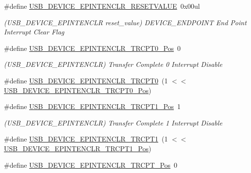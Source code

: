 \begin{DoxyCompactItemize}
\#define \mbox{\hyperlink{group___s_a_m_d21___u_s_b_gabf49468e9c86ee59100adb4a9c864037}{U\+S\+B\+\_\+\+D\+E\+V\+I\+C\+E\+\_\+\+E\+P\+I\+N\+T\+E\+N\+C\+L\+R\+\_\+\+R\+E\+S\+E\+T\+V\+A\+L\+UE}}~0x00ul
\begin{DoxyCompactList}\small\item\em (U\+S\+B\+\_\+\+D\+E\+V\+I\+C\+E\+\_\+\+E\+P\+I\+N\+T\+E\+N\+C\+LR reset\+\_\+value) D\+E\+V\+I\+C\+E\+\_\+\+E\+N\+D\+P\+O\+I\+NT End Point Interrupt Clear Flag \end{DoxyCompactList}\item 
\#define \mbox{\hyperlink{group___s_a_m_d21___u_s_b_ga8aecc1fe00ed6d981d1ffe46255b843b}{U\+S\+B\+\_\+\+D\+E\+V\+I\+C\+E\+\_\+\+E\+P\+I\+N\+T\+E\+N\+C\+L\+R\+\_\+\+T\+R\+C\+P\+T0\+\_\+\+Pos}}~0
\begin{DoxyCompactList}\small\item\em (U\+S\+B\+\_\+\+D\+E\+V\+I\+C\+E\+\_\+\+E\+P\+I\+N\+T\+E\+N\+C\+LR) Transfer Complete 0 Interrupt Disable \end{DoxyCompactList}\item 
\#define \mbox{\hyperlink{group___s_a_m_d21___u_s_b_gaf352383baefa4d497e79367fb06f1cae}{U\+S\+B\+\_\+\+D\+E\+V\+I\+C\+E\+\_\+\+E\+P\+I\+N\+T\+E\+N\+C\+L\+R\+\_\+\+T\+R\+C\+P\+T0}}~(1 $<$$<$ \mbox{\hyperlink{group___s_a_m_d21___u_s_b_ga8aecc1fe00ed6d981d1ffe46255b843b}{U\+S\+B\+\_\+\+D\+E\+V\+I\+C\+E\+\_\+\+E\+P\+I\+N\+T\+E\+N\+C\+L\+R\+\_\+\+T\+R\+C\+P\+T0\+\_\+\+Pos}})
\item 
\#define \mbox{\hyperlink{group___s_a_m_d21___u_s_b_gaae736286cfbb572fcea8e5d21ca08658}{U\+S\+B\+\_\+\+D\+E\+V\+I\+C\+E\+\_\+\+E\+P\+I\+N\+T\+E\+N\+C\+L\+R\+\_\+\+T\+R\+C\+P\+T1\+\_\+\+Pos}}~1
\begin{DoxyCompactList}\small\item\em (U\+S\+B\+\_\+\+D\+E\+V\+I\+C\+E\+\_\+\+E\+P\+I\+N\+T\+E\+N\+C\+LR) Transfer Complete 1 Interrupt Disable \end{DoxyCompactList}\item 
\#define \mbox{\hyperlink{group___s_a_m_d21___u_s_b_ga2a2de217ab6a39746add512ab48c0e03}{U\+S\+B\+\_\+\+D\+E\+V\+I\+C\+E\+\_\+\+E\+P\+I\+N\+T\+E\+N\+C\+L\+R\+\_\+\+T\+R\+C\+P\+T1}}~(1 $<$$<$ \mbox{\hyperlink{group___s_a_m_d21___u_s_b_gaae736286cfbb572fcea8e5d21ca08658}{U\+S\+B\+\_\+\+D\+E\+V\+I\+C\+E\+\_\+\+E\+P\+I\+N\+T\+E\+N\+C\+L\+R\+\_\+\+T\+R\+C\+P\+T1\+\_\+\+Pos}})
\item 
\#define \mbox{\hyperlink{group___s_a_m_d21___u_s_b_ga049c9272ae142ffc562966dc3debdd0f}{U\+S\+B\+\_\+\+D\+E\+V\+I\+C\+E\+\_\+\+E\+P\+I\+N\+T\+E\+N\+C\+L\+R\+\_\+\+T\+R\+C\+P\+T\+\_\+\+Pos}}~0

\end{DoxyCompactItemize}
